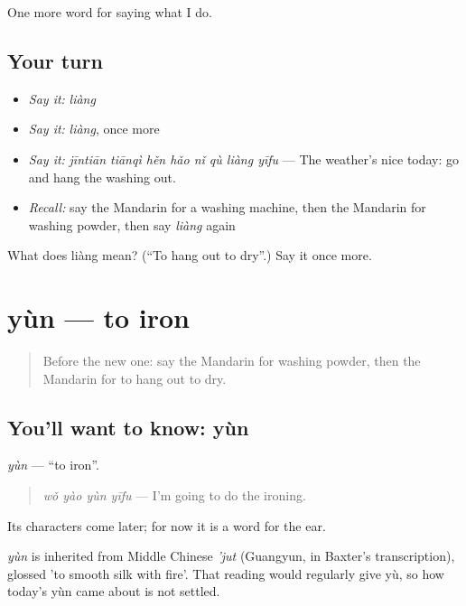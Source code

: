 \begin{grammarlens}[title={What you've built}]
One more word for saying what I do.
\end{grammarlens}

\subsection*{Your turn}
\begin{itemize}
\raggedright
  \item \emph{Say it:} \emph{liàng}
  \item \emph{Say it:} \emph{liàng}, once more
  \item \emph{Say it:} \emph{jīntiān tiānqì hěn hǎo nǐ qù liàng yīfu} — The weather's nice today: go and hang the washing out.
  \item \emph{Recall:} say the Mandarin for a washing machine, then the Mandarin for washing powder, then say \emph{liàng} again
\end{itemize}

\begin{tcolorbox}[breakable,colback=teal!4,colframe=teal!35!black,title={Before you move on}]
What does liàng mean? (\textquotedblleft{}To hang out to dry\textquotedblright{}.) Say it once more.
\end{tcolorbox}
\section[yùn]{yùn — to iron}

\label{lesson:ZH-C179-yun}



\begin{quote}
Before the new one: say the Mandarin for washing powder, then the Mandarin for to hang out to dry.
\end{quote}

\subsection*{You'll want to know: yùn}
\emph{yùn} — \textquotedblleft{}to iron\textquotedblright{}.

\begin{quote}
\emph{wǒ yào yùn yīfu} — I'm going to do the ironing.
\end{quote}

Its characters come later; for now it is a word for the ear.

\begin{cousinweb}
\emph{yùn} is inherited from Middle Chinese \emph{'jut} (Guangyun, in Baxter's transcription), glossed 'to smooth silk with fire'. That reading would regularly give yù, so how today's yùn came about is not settled.
\end{cousinweb}

